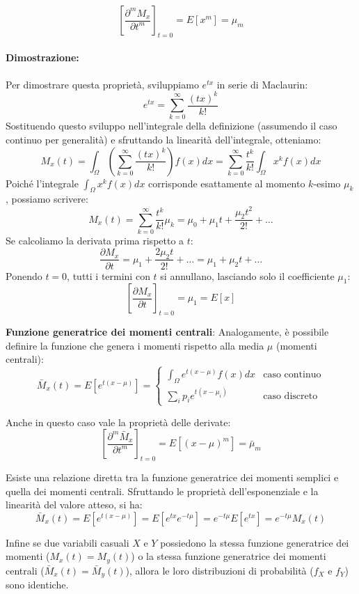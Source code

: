 \documentclass{article}
\theoremstyle{remark}
\begin{document}
\[
\left[ \frac{\partial ^m M_x}{\partial t^m} \right]_{t=0} = E[x^m] = \mu_m
\]

\paragraph{Dimostrazione:}
Per dimostrare questa proprietà, sviluppiamo $e^{tx}$ in serie di Maclaurin:
\[ 
e^{tx} = \sum_{k=0}^{\infty} \frac{(tx)^k}{k!} 
\]
Sostituendo questo sviluppo nell'integrale della definizione (assumendo il caso continuo per generalità) e sfruttando la linearità dell'integrale, otteniamo:
\[
M_x(t) = \int_\Omega \left( \sum_{k=0}^{\infty} \frac{(tx)^k}{k!} \right) f(x) dx = \sum_{k=0}^{\infty} \frac{t^k}{k!} \int_\Omega x^k f(x) dx 
\]
Poiché l'integrale $\int_\Omega x^k f(x) dx$ corrisponde esattamente al momento $k$-esimo $\mu_k$, possiamo scrivere:
\[
M_x(t) = \sum_{k=0}^{\infty} \frac{t^k}{k!} \mu_k = \mu_0 + \mu_1 t + \frac{\mu_2 t^2}{2!} + \ldots
\]
Se calcoliamo la derivata prima rispetto a $t$:
\[ \frac{\partial M_x}{\partial t} = \mu_1 + \frac{2\mu_2 t}{2!} + \ldots = \mu_1 + \mu_2 t + \ldots \]
Ponendo $t=0$, tutti i termini con $t$ si annullano, lasciando solo il coefficiente $\mu_1$:
\[ \left[ \frac{\partial M_x}{\partial t} \right]_{t=0} = \mu_1 = E[x] \]

\begin{definizione}
    \textbf{Funzione generatrice dei momenti centrali}:
    Analogamente, è possibile definire la funzione che genera i momenti rispetto alla media $\mu$ (momenti centrali):
        \[
    \bar{M}_x(t) = E[e^{t(x-\mu)}] = 
    \begin{cases} 
    \displaystyle \int_\Omega e^{t(x-\mu)}f(x) dx & \text{caso continuo} \\[1em]
    \displaystyle \sum_i p_i e^{t(x-\mu_i)} & \text{caso discreto}
    \end{cases}
    \]
\end{definizione}

Anche in questo caso vale la proprietà delle derivate:
\[
\left[ \frac{\partial ^m \bar{M}_x}{\partial t^m}\right]_{t=0} = E[(x-\mu)^m] = \bar{\mu}_m 
\]


Esiste una relazione diretta tra la funzione generatrice dei momenti semplici e quella dei momenti centrali. Sfruttando le proprietà dell'esponenziale e la linearità del valore atteso, si ha:
\[
\bar{M}_x(t) = E[e^{t(x-\mu)}] = E[e^{tx}e^{-t\mu}] = e^{-t\mu}E[e^{tx}] = e^{-t\mu}M_x(t)
\]


Infine se due variabili casuali $X$ e $Y$ possiedono la stessa funzione generatrice dei momenti ($M_x(t)=M_y(t)$) o la stessa funzione generatrice dei momenti centrali ($\bar{M}_x(t)=\bar{M}_y(t)$), allora le loro distribuzioni di probabilità ($f_X$ e $f_Y$) sono identiche.
\end{document}
